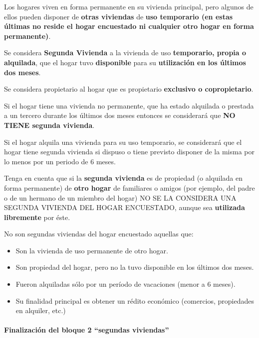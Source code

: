 \documentclass[
  openany]{book}
\begin{document}
Los hogares viven en forma permanente en su vivienda principal, pero algunos de ellos pueden disponer de \textbf{otras viviendas} de \textbf{uso temporario (en estas últimas no reside el hogar encuestado ni cualquier otro hogar en forma permanente)}.

Se considera \textbf{Segunda Vivienda} a la vivienda de uso \textbf{temporario, propia o alquilada}, que el hogar tuvo \textbf{disponible} para su \textbf{utilización en los últimos dos meses}.

Se considera propietario al hogar que es propietario \textbf{exclusivo o copropietario}.

Si el hogar tiene una vivienda no permanente, que ha estado alquilada o prestada a un tercero durante los últimos dos meses entonces se considerará que \textbf{NO TIENE segunda vivienda}.

Si el hogar alquila una vivienda para su uso temporario, se considerará que el hogar tiene segunda vivienda si dispuso o tiene previsto disponer de la misma por lo menos por un periodo de 6 meses.

Tenga en cuenta que si la \textbf{segunda vivienda} es de propiedad (o alquilada en forma permanente) de \textbf{otro hogar} de familiares o amigos (por ejemplo, del padre o de un hermano de un miembro del hogar) NO SE LA CONSIDERA UNA SEGUNDA VIVIENDA DEL HOGAR ENCUESTADO, aunque sea \textbf{utilizada libremente} por éste.

No son segundas viviendas del hogar encuestado aquellas que:

\begin{itemize}
\item
  Son la vivienda de uso permanente de otro hogar.
\item
  Son propiedad del hogar, pero no la tuvo disponible en los últimos dos meses.
\item
  Fueron alquiladas sólo por un período de vacaciones (menor a 6 meses).
\item
  Su finalidad principal es obtener un rédito económico (comercios, propiedades en alquiler, etc.)
\end{itemize}

\hypertarget{finalizaciuxf3n-del-bloque-2-segundas-viviendas}{%
\paragraph{Finalización del bloque 2 ``segundas viviendas''}\label{finalizaciuxf3n-del-bloque-2-segundas-viviendas}}
\end{document}
